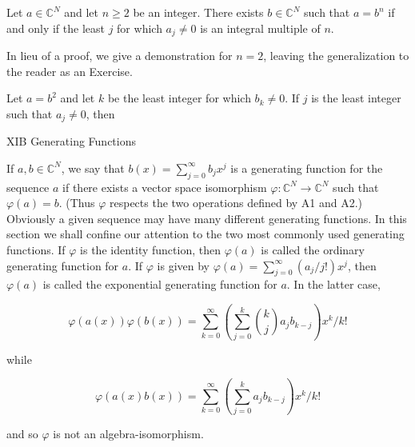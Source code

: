 Let $a \in \mathbb{C}^N$ and let $n \geq 2$ be an integer. There exists $b \in \mathbb{C}^N$ such that $a = b^n$ if and only if the least $j$ for which $a_j \neq 0$ is an integral multiple of $n$.

In lieu of a proof, we give a demonstration for $n = 2$, leaving the generalization to the reader as an Exercise.

Let $a = b^2$ and let $k$ be the least integer for which $b_k \neq 0$. If $j$ is the least integer such that $a_j \neq 0$, then

XIB Generating Functions

If $a, b \in \mathbb{C}^N$, we say that $b(x) = \sum_{j=0}^{\infty} b_j x^j$ is a generating function for the sequence $a$ if there exists a vector space isomorphism $\varphi: \mathbb{C}^N \to \mathbb{C}^N$ such that $\varphi(a) = b$. (Thus $\varphi$ respects the two operations defined by A1 and A2.) Obviously a given sequence may have many different generating functions. In this section we shall confine our attention to the two most commonly used generating functions. If $\varphi$ is the identity function, then $\varphi(a)$ is called the ordinary generating function for $a$. If $\varphi$ is given by $\varphi(a) = \sum_{j=0}^{\infty} (a_j/j!) x^j$, then $\varphi(a)$ is called the exponential generating function for $a$. In the latter case,

$$\varphi(a(x))\varphi(b(x)) = \sum_{k=0}^{\infty} \left( \sum_{j=0}^{k} \binom{k}{j} a_j b_{k-j} \right) x^k/k!$$

while

$$\varphi(a(x)b(x)) = \sum_{k=0}^{\infty} \left( \sum_{j=0}^{k} a_j b_{k-j} \right) x^k/k!$$

and so $\varphi$ is not an algebra-isomorphism.
